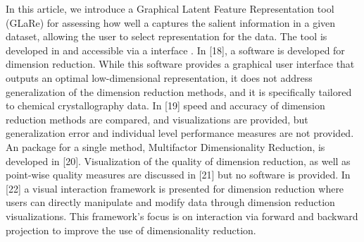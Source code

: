 In this article, we introduce a Graphical Latent Feature Representation tool (GLaRe) for assessing how well a  captures the salient information in a given dataset, allowing the user to select  representation for the data. The tool is developed in  \parencite{r_core_team_r_2022} and accessible via a   interface \parencite{chang_shiny_2021}. 
In [18], a software is developed for dimension reduction. 
While this software provides a graphical user interface that outputs an optimal low-dimensional representation, it does not address generalization of the dimension reduction methods, and it is specifically tailored to chemical crystallography data.
In [19] speed and accuracy of dimension reduction methods are compared, and visualizations are provided, but generalization error and individual level performance measures are not provided. 
An  package for a single method, Multifactor Dimensionality Reduction, is developed in [20]. Visualization of the quality of dimension reduction, as well as point-wise quality measures are discussed in [21] but no software is provided. 
In [22] a visual interaction framework is presented for dimension reduction where users can directly manipulate and modify data through dimension reduction visualizations. This framework's focus is on interaction via forward and backward projection to improve the use of dimensionality
reduction.


